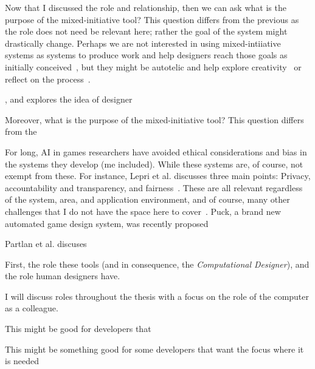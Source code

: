 Now that I discussed the role and relationship, then we can ask what is the purpose of the mixed-initiative tool? This question differs from the previous as the role does not need be relevant here; rather the goal of the system might drastically change. Perhaps we are not interested in using mixed-intiiative systems as systems to produce work and help designers reach those goals as initially conceived~\cite{yannakakis_mixed-initiative_2014,liapis_mixed-initiative_2016}, but they might be autotelic and help explore creativity~\cite{compton_casual_2015} or reflect on the process~\cite{kreminski_reflective_2021}.


, and explores the idea of designer 

Moreover, what is the purpose of the mixed-initiative tool? This question differs from the 

For long, AI in games researchers have avoided ethical considerations and bias in the systems they develop (me included). While these systems are, of course, not exempt from these. For instance, Lepri et al. discusses three main points: Privacy, accountability and transparency, and fairness~\cite{lepri_ethical_2021}. These are all relevant regardless of the system, area, and application environment, and of course, many other challenges that I do not have the space here to cover~\cite{bender_dangers_2021}. Puck, a brand new automated game design system, was recently proposed 

Partlan et al. discuses 

First, the role these tools (and in consequence, the \emph{Computational Designer}), and the role human designers have.

I will discuss roles throughout the thesis with a focus on the role of the computer as a colleague. 

This might be good for developers that 

This might be something good for some developers that want the focus where it is needed

